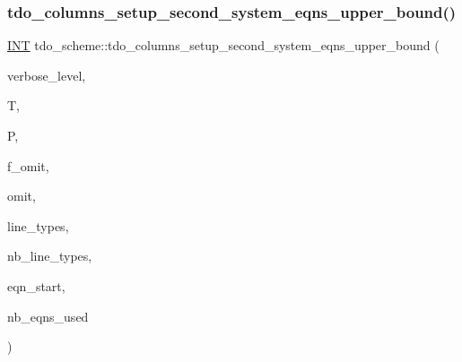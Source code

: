 \subsubsection{\texorpdfstring{tdo\+\_\+columns\+\_\+setup\+\_\+second\+\_\+system\+\_\+eqns\+\_\+upper\+\_\+bound()}{tdo\_columns\_setup\_second\_system\_eqns\_upper\_bound()}}
{\footnotesize\ttfamily \mbox{\hyperlink{galois_8h_a09fddde158a3a20bd2dcadb609de11dc}{I\+NT}} tdo\+\_\+scheme\+::tdo\+\_\+columns\+\_\+setup\+\_\+second\+\_\+system\+\_\+eqns\+\_\+upper\+\_\+bound (\begin{DoxyParamCaption}\item[{\mbox{\hyperlink{galois_8h_a09fddde158a3a20bd2dcadb609de11dc}{I\+NT}}}]{verbose\+\_\+level,  }\item[{\mbox{\hyperlink{classtdo__data}{tdo\+\_\+data}} \&}]{T,  }\item[{\mbox{\hyperlink{classpartitionstack}{partitionstack}} \&}]{P,  }\item[{\mbox{\hyperlink{galois_8h_a09fddde158a3a20bd2dcadb609de11dc}{I\+NT}}}]{f\+\_\+omit,  }\item[{\mbox{\hyperlink{galois_8h_a09fddde158a3a20bd2dcadb609de11dc}{I\+NT}}}]{omit,  }\item[{\mbox{\hyperlink{galois_8h_a09fddde158a3a20bd2dcadb609de11dc}{I\+NT}} $\ast$}]{line\+\_\+types,  }\item[{\mbox{\hyperlink{galois_8h_a09fddde158a3a20bd2dcadb609de11dc}{I\+NT}}}]{nb\+\_\+line\+\_\+types,  }\item[{\mbox{\hyperlink{galois_8h_a09fddde158a3a20bd2dcadb609de11dc}{I\+NT}}}]{eqn\+\_\+start,  }\item[{\mbox{\hyperlink{galois_8h_a09fddde158a3a20bd2dcadb609de11dc}{I\+NT}} \&}]{nb\+\_\+eqns\+\_\+used }\end{DoxyParamCaption})}

\mbox{\label{classtdo__scheme_af2ea07100704a7af6b8f51bd0d7f55d1}} 
